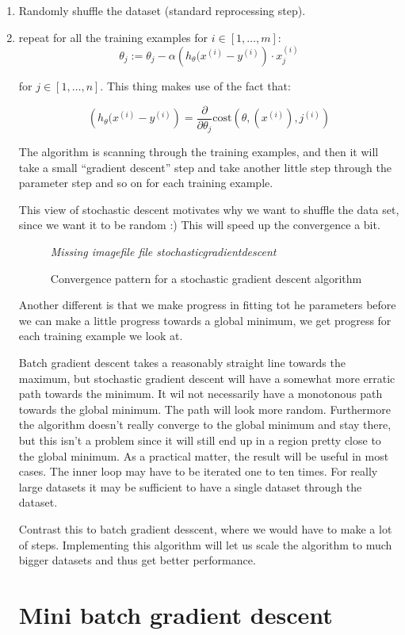 \documentclass[a4, 12pt, english, USenglish]{scrreprt}
\newcommand{\xscreenshot}[2]{
\begin{figure}[htb]
\begin{center}
\em Missing imagefile file #1
\end{center}
\label{#1}
\caption{#2}
\end{figure}}
\newcommand{\brackets}[1]{\ensuremath{\left[{#1}\right]}}
\newcommand{\parens}[1]{\ensuremath{\left({#1}\right)}}
\begin{document}
\begin{enumerate}
\item Randomly shuffle the dataset (standard reprocessing step).
\item repeat for  all the training examples for \(i \in  \brackets{1,\ldots,m} \):
\[
   \theta_j := \theta_j - \alpha \parens{h_{\theta}(x^{(i)} - y^{(i)}}
   \cdot x_j^{(i)}
\]

for \(j \in  \brackets{1,\ldots,n} \).   This thing makes use of the
fact that:

\[
\parens{h_{\theta}(x^{(i)} - y^{(i)}} =
\frac{\partial}{\partial\theta_j}\mbox{cost}\parens{\theta, (x^{(i)}),j^{(i)}}
\]

The algorithm is scanning through the training examples, and then it
will take a small ``gradient descent'' step and take another little
step through the parameter step and so on for each training example.

This view  of stochastic descent motivates why we want to shuffle the
data set, since we want it to be random :)  This will speed up the
convergence a bit.    


\xscreenshot{stochasticgradientdescent}{Convergence pattern for a
  stochastic gradient descent algorithm}

Another different is that we make progress in fitting tot he
parameters before we can make a little progress towards a global
minimum, we get progress for each training example we look at.

Batch gradient descent takes a reasonably straight line towards the
maximum, but stochastic gradient descent will have a somewhat more
erratic path towards the minimum.  It wil not necessarily have a
monotonous path towards the global minimum.  The path will look more
random.  Furthermore the algorithm doesn't really converge to the
global minimum and stay there, but this isn't a problem since it will
still end up in a region pretty close to the global minimum.  As a
practical matter, the result will be useful in most cases.  The inner
loop may have to be iterated one to ten times.  For really large
datasets it may be sufficient to have a single dataset through the
dataset.

Contrast this to  batch gradient desscent, where we would have to make
a lot of steps.   Implementing this algorithm will let us scale the
algorithm to much bigger datasets and thus get better performance.

\section{Mini batch gradient descent}



\end{enumerate}
\end{document}
